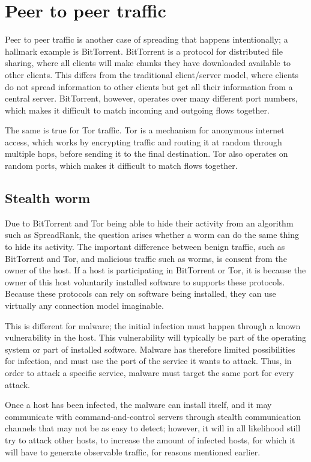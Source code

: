 \section{Peer to peer traffic}
Peer to peer traffic is another case of \gls{spreading} that happens intentionally;
a hallmark example is BitTorrent.
BitTorrent is a protocol for distributed file sharing, where all clients will make chunks they have downloaded available to other clients.
This differs from the traditional client/server model, where clients do not spread information to other clients but get all their information from a central server.
BitTorrent, however, operates over many different port numbers, which makes it difficult to match incoming and outgoing flows together.

The same is true for Tor traffic.
Tor is a mechanism for anonymous internet access, which works by encrypting traffic and routing it at random through multiple hops,
before sending it to the final destination.
Tor also operates on random ports, which makes it difficult to match flows together.

\subsection{Stealth worm}
\label{sec:stealth}
Due to BitTorrent and Tor being able to hide their activity from an algorithm such as SpreadRank,
the question arises whether a worm can do the same thing to hide its activity.
The important difference between benign traffic, such as BitTorrent and Tor, and malicious traffic such as worms,
is consent from the owner of the host.
If a host is participating in BitTorrent or Tor, it is because the owner of this host voluntarily installed software to supports these protocols.
Because these protocols can rely on software being installed, they can use virtually any connection model imaginable.

This is different for malware;
the initial infection must happen through a known vulnerability in the host.
This vulnerability will typically be part of the operating system or part of installed software.
Malware has therefore limited possibilities for infection, and must use the port of the service it wants to attack.
Thus, in order to attack a specific service, malware must target the same port for every attack.

Once a host has been infected, the malware can install itself, and it may communicate with command-and-control servers through stealth communication channels that may not be as easy to detect;
however, it will in all likelihood still try to attack other hosts, to increase the amount of infected hosts, for which it will have to generate observable traffic, for reasons mentioned earlier.



